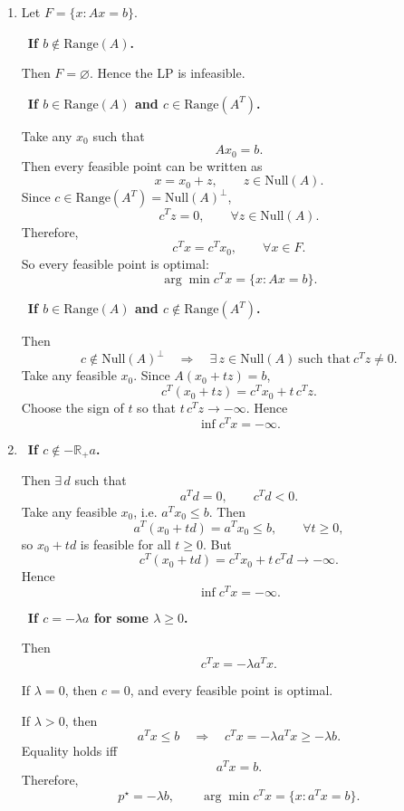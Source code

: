 \documentclass[11pt,letter,notitlepage]{article}
\theoremstyle{definition}
\begin{document}
\newpage

\begin{solution}
\leavevmode\vspace{-2em}
\begin{enumerate}[label=(\alph*)]

\item
Let \(F=\{x:Ax=b\}\).

\ \textbf{If \(b\notin\mathrm{Range}(A)\).}

Then \(F=\varnothing\). Hence the LP is infeasible.

\ \textbf{If \(b\in\mathrm{Range}(A)\) and \(c\in\mathrm{Range}(A^T)\).}

Take any \(x_0\) such that
\[
Ax_0=b.
\]
Then every feasible point can be written as
\[
x=x_0+z,\qquad z\in\mathrm{Null}(A).
\]
Since \(c\in\mathrm{Range}(A^T)=\mathrm{Null}(A)^\perp\),
\[
c^Tz=0,\qquad \forall z\in\mathrm{Null}(A).
\]
Therefore,
\[
c^Tx=c^Tx_0,\qquad \forall x\in F.
\]
So every feasible point is optimal:
\[
\arg\min c^Tx = \{x:Ax=b\}.
\]

\ \textbf{If \(b\in\mathrm{Range}(A)\) and \(c\notin\mathrm{Range}(A^T)\).}

Then
\[
c\notin\mathrm{Null}(A)^\perp
\quad\Longrightarrow\quad
\exists\,z\in\mathrm{Null}(A)\ \text{such that}\ c^Tz\neq 0.
\]
Take any feasible \(x_0\). Since \(A(x_0+t z)=b\),
\[
c^T(x_0+t z)=c^Tx_0+t\,c^Tz.
\]
Choose the sign of \(t\) so that \(t\,c^Tz\to -\infty\). Hence
\[
\inf c^Tx=-\infty.
\]

\medskip

\item
{}\ \textbf{If \(c\notin -\mathbb R_+ a\).}

Then \(\exists\,d\) such that
\[
a^Td=0,\qquad c^Td<0.
\]
Take any feasible \(x_0\), i.e. \(a^Tx_0\le b\). Then
\[
a^T(x_0+t d)=a^Tx_0\le b,\qquad \forall t\ge 0,
\]
so \(x_0+t d\) is feasible for all \(t\ge 0\). But
\[
c^T(x_0+t d)=c^Tx_0+t\,c^Td\to -\infty.
\]
Hence
\[
\inf c^Tx=-\infty.
\]

\ \textbf{If \(c=-\lambda a\) for some \(\lambda\ge 0\).}

Then
\[
c^Tx=-\lambda a^Tx.
\]

If \(\lambda=0\), then \(c=0\), and every feasible point is optimal.

If \(\lambda>0\), then
\[
a^Tx\le b
\quad\Longrightarrow\quad
c^Tx=-\lambda a^Tx\ge -\lambda b.
\]
Equality holds iff
\[
a^Tx=b.
\]
Therefore,
\[
p^\star=-\lambda b,
\qquad
\arg\min c^Tx=\{x:a^Tx=b\}.
\]


\end{enumerate}
\end{solution}
\end{document}
